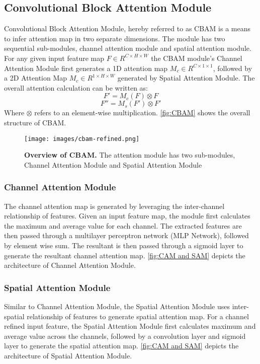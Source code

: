 \documentclass[review]{elsarticle}
\begin{document}
\subsection{Convolutional Block Attention Module}
Convolutional Block Attention Module\cite{Woo2018}, hereby referred to as CBAM is a means to infer attention map in two separate dimensions. The module has two sequential sub-modules, channel attention module and spatial attention module. For any given input feature map \(F \in R^{C \times H \times W}\) the CBAM module's Channel Attention Module first generates a 1D attention map \(M_{c} \in R^{C \times 1 \times 1}\), followed by a 2D Attention Map \(M_{c} \in R^{1 \times H \times W}\) generated by Spatial Attention Module. The overall attention calculation can be written as:
\[ F' = M_{c}(F) \otimes F\]
\[ F'' = M_{s}(F') \otimes F'\]
Where \(\otimes\) refers to an element-wise multiplication. \autoref{fig:CBAM} shows the overall structure of CBAM.

\begin{figure}[t]
\caption{\textbf{Overview of CBAM.} The attention module has two sub-modules, Channel Attention Module and Spatial Attention Module}
\centering
\texttt{[image: images/cbam-refined.png]}
\label{fig:CBAM}
\end{figure}

\subsubsection{Channel Attention Module}
The channel attention map is generated by leveraging the inter-channel relationship of features. Given an input feature map, the module first calculates the maximum and average value for each channel. The extracted features are then passed through a multilayer perceptron network (MLP Network), followed by element wise sum. The resultant is then passed through a sigmoid layer to generate the resultant channel attention map. \autoref{fig:CAM and SAM} depicts the architecture of Channel Attention Module.

\subsubsection{Spatial Attention Module}
Similar to Channel Attention Module, the Spatial Attention Module uses inter-spatial relationship of features to generate spatial attention map. For a channel refined input feature, the Spatial Attention Module first calculates maximum and average value across the channels, followed by a convolution layer and sigmoid layer to generate the spatial attention map. \autoref{fig:CAM and SAM} depicts the architecture of Spatial Attention Module.
\end{document}
